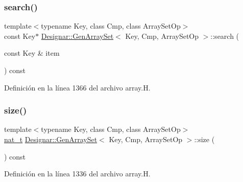 \mbox{\label{class_designar_1_1_gen_array_set_adbe26651c80bbcc92afe2563f6bcefc3}} 
\subsubsection{\texorpdfstring{search()}{search()}\hspace{0.1cm}{\footnotesize\ttfamily [2/2]}}
{\footnotesize\ttfamily template$<$typename Key, class Cmp, class Array\+Set\+Op$>$ \\
const Key$\ast$ \hyperlink{class_designar_1_1_gen_array_set}{Designar\+::\+Gen\+Array\+Set}$<$ Key, Cmp, Array\+Set\+Op $>$\+::search (\begin{DoxyParamCaption}\item[{const Key \&}]{item }\end{DoxyParamCaption}) const\hspace{0.3cm}{\ttfamily [inline]}}



Definición en la línea 1366 del archivo array.\+H.

\mbox{\label{class_designar_1_1_gen_array_set_ab5b56f597b39e2dbf03514a2eb096e8a}} 
\subsubsection{\texorpdfstring{size()}{size()}}
{\footnotesize\ttfamily template$<$typename Key, class Cmp, class Array\+Set\+Op$>$ \\
\hyperlink{namespace_designar_aa72662848b9f4815e7bf31a7cf3e33d1}{nat\+\_\+t} \hyperlink{class_designar_1_1_gen_array_set}{Designar\+::\+Gen\+Array\+Set}$<$ Key, Cmp, Array\+Set\+Op $>$\+::size (\begin{DoxyParamCaption}{ }\end{DoxyParamCaption}) const\hspace{0.3cm}{\ttfamily [inline]}}



Definición en la línea 1336 del archivo array.\+H.

\mbox{\label{class_designar_1_1_gen_array_set_ab117cdee923c27d7922a02336440b2ff}} 

